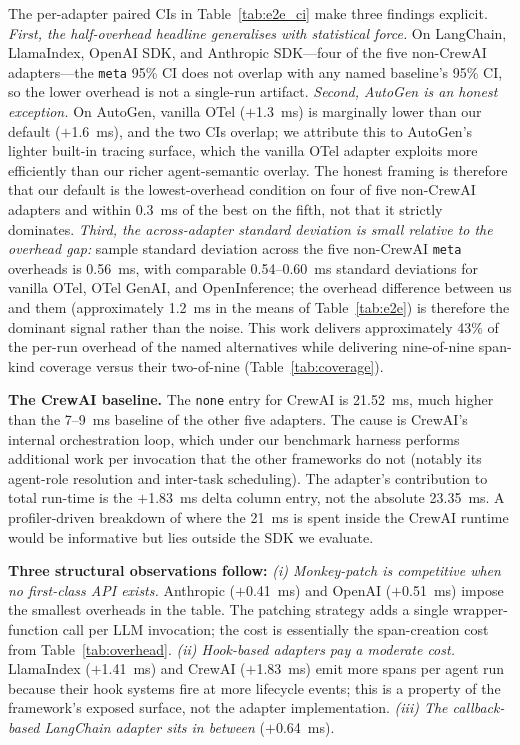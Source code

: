 \documentclass[sigconf,review,anonymous,9pt]{acmart}
\begin{document}
The per-adapter paired CIs in Table~\ref{tab:e2e_ci} make three
findings explicit. \textit{First, the half-overhead headline
generalises with statistical force.} On LangChain, LlamaIndex,
OpenAI SDK, and Anthropic SDK---four of the five non-CrewAI
adapters---the \texttt{meta} 95\% CI does not overlap with any
named baseline's 95\% CI, so the lower overhead is not a single-run
artifact. \textit{Second, AutoGen is an honest exception.}
On AutoGen, vanilla OTel ($+$1.3~ms) is marginally lower than our
default ($+$1.6~ms), and the two CIs overlap; we attribute this to
AutoGen's lighter built-in tracing surface, which the vanilla OTel
adapter exploits more efficiently than our richer agent-semantic
overlay. The honest framing is therefore that our default is the
lowest-overhead condition on four of five non-CrewAI adapters and
within 0.3~ms of the best on the fifth, not that it strictly
dominates. \textit{Third, the across-adapter standard deviation is small
relative to the overhead gap:} sample standard deviation across the
five non-CrewAI \texttt{meta} overheads is 0.56~ms, with comparable
0.54--0.60~ms standard deviations for vanilla OTel, OTel GenAI, and
OpenInference; the overhead difference between us and them
(approximately 1.2~ms in the means of Table~\ref{tab:e2e}) is
therefore the dominant signal rather than the noise. This work
delivers approximately 43\% of the per-run overhead of the named
alternatives while delivering nine-of-nine span-kind coverage versus
their two-of-nine (Table~\ref{tab:coverage}).

\textbf{The CrewAI baseline.} The \texttt{none} entry for CrewAI is
21.52~ms, much higher than the 7--9~ms baseline of the other five
adapters. The cause is CrewAI's internal orchestration loop, which
under our benchmark harness performs additional work per invocation
that the other frameworks do not (notably its agent-role resolution
and inter-task scheduling). The adapter's contribution to total
run-time is the $+$1.83~ms delta column entry, not the absolute
23.35~ms. A profiler-driven breakdown of where the 21~ms is spent
inside the CrewAI runtime would be informative but lies outside the
SDK we evaluate.

\textbf{Three structural observations follow:}
\textit{(i) Monkey-patch is competitive when no first-class API
exists.} Anthropic ($+$0.41~ms) and OpenAI ($+$0.51~ms) impose the
smallest overheads in the table. The patching strategy adds a
single wrapper-function call per LLM invocation; the cost is
essentially the span-creation cost from Table~\ref{tab:overhead}.
\textit{(ii) Hook-based adapters pay a moderate cost.} LlamaIndex
($+$1.41~ms) and CrewAI ($+$1.83~ms) emit more spans per agent run
because their hook systems fire at more lifecycle events; this is a
property of the framework's exposed surface, not the adapter
implementation. \textit{(iii) The callback-based LangChain adapter
sits in between} ($+$0.64~ms).
\end{document}
